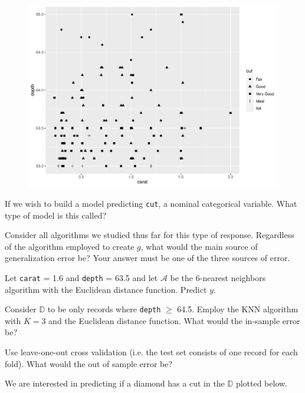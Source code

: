 \documentclass[12pt]{article}
\begin{document}
\begin{figure}[htp]
\centering
\includegraphics[width=5.9in]{caratdepthcut1}
\end{figure}

\benum

 If we wish to build a model predicting \texttt{cut}, a nominal categorical variable. What type of model is this called? 

 Consider all algorithms we studied thus far for this type of response. Regardless of the algorithm employed to create $g$, what would the main source of generalization error be? Your answer must be one of the three sources of error.

 Let \texttt{carat} = 1.6 and \texttt{depth} = 63.5 and let $\mathcal{A}$ be the 6-nearest neighbors algorithm with the Euclidean distance function. Predict $y$.

Consider $\mathbb{D}$ to be only records where \texttt{depth} $\geq$ 64.5. Employ the KNN algorithm with $K=3$ and the Euclidean distance function. 
 What would the in-sample error be? 

 Use leave-one-out cross validation (i.e. the test set consists of one record for each fold). What would the out of sample error be? 

We are interested in predicting if a diamond has a cut  in the $\mathbb{D}$ plotted below.
\end{document}
